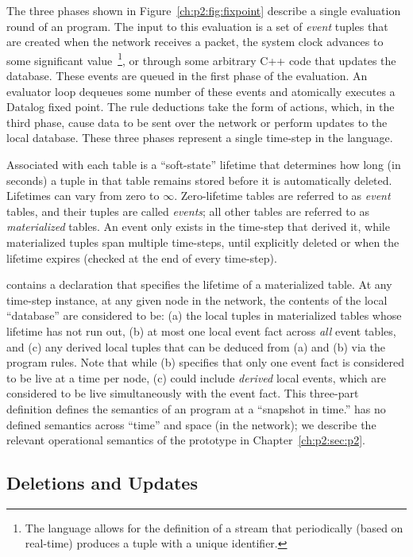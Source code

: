 The three phases shown in Figure~\ref{ch:p2:fig:fixpoint} describe a single
evaluation round of an \OVERLOG program.  The input to this evaluation is a set
of {\em event} tuples that are created when the network receives a packet, the
system clock advances to some significant value~\footnote{The \OVERLOG language
allows for the definition of a stream that periodically (based on real-time)
produces a tuple with a unique identifier.}, or through some arbitrary C++ code
that updates the database.  These events are queued in the first phase of the
evaluation.  An evaluator loop dequeues some number of these events and
atomically executes a Datalog fixed point.  The rule deductions take the form
of actions, which, in the third phase, cause data to be sent over the network
or perform updates to the local database.  These three phases represent a
single time-step in the \OVERLOG language.

Associated with each \OVERLOG table is a ``soft-state'' lifetime that
determines how long (in seconds) a tuple in that table remains stored before it
is automatically deleted.  Lifetimes can vary from zero to $\infty$.
Zero-lifetime tables are referred to as {\em event} tables, and their tuples
are called {\em events}; all other tables are referred to as {\em materialized}
tables.  An event only exists in the time-step that derived it, while
materialized tuples span multiple time-steps, until explicitly deleted or when
the lifetime expires (checked at the end of every time-step).

\OVERLOG contains a  declaration that specifies the lifetime of
a materialized table.  At any time-step instance, at any given node in the
network, the contents of the local \OVERLOG ``database'' are considered to be:
(a) the local tuples in materialized tables whose lifetime has not run out, (b)
at most one local event fact across {\em all} event tables, and (c) any derived
local tuples that can be deduced from (a) and (b) via the program rules.  Note
that while (b) specifies that only one event fact is considered to be live at a
time per node, (c) could include {\em derived} local events, which are
considered to be live simultaneously with the event fact.  This three-part
definition defines the semantics of an \OVERLOG program at a ``snapshot in
time.'' \OVERLOG has no defined semantics across ``time'' and space (in the network);
we describe the relevant operational semantics of the prototype in
Chapter~\ref{ch:p2:sec:p2}.
     
\subsection{Deletions and Updates}

